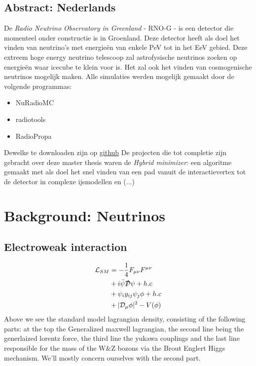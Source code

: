 \documentclass[11pt,a4paper,faculty=we,language=en,doctype=report]{cls/ugent-doc}
\begin{document}
\section{Abstract: Nederlands}
De \textit{Radio Neutrino Observatory in Greenland} - RNO-G - is een detector die momenteel onder constructie is
in Groenland. Deze detector heeft als doel het vinden van neutrino's met energieën van enkele PeV
tot in het EeV gebied. Deze extreem hoge energy neutrino telescoop zal astrofysische neutrinos
zoeken op energieën waar icecube te klein voor is. Het zal ook het vinden van cosmogenische
neutrinos mogelijk maken.
Alle simulaties werden mogelijk gemaakt door de volgende programmas:
\begin{itemize}
	\item NuRadioMC
	\item radiotools
	\item RadioPropa
\end{itemize}
Dewelke te downloaden zijn op \href{https://github.com/nu-radio}{github}
De projecten die tot completie zijn gebracht over deze master thesis waren de
\textit{Hybrid minimizer}: een algoritme gemaakt met als doel het snel vinden van
een pad vanuit de interactievertex tot de detector in complexe ijsmodellen en
(...)
\chapter{Background: Neutrinos}
\section{Electroweak interaction}
\begin{align*}
  \mathcal{L}_{SM} &= -\frac{1}{4}F_{\mu\nu}F^{\mu\nu}\\
                   & + i\bar{\psi}\slashed{\mathcal{D}}\psi + h.c\\
                   & + \psi_iy_{ij}\psi_j\phi + h.c\\
                   &+|\mathcal{D}_\mu\phi|^2 - V(\phi)
\end{align*}
Above we see the standard model lagrangian density, consisting of the following parts: at the top the Generalized maxwell lagrangian,
the second line being the generlaized lorentz force, the third line the yukawa couplings and the last line responsible for
the mass of the W\&Z bozons via the Brout Englert Higgs mechanism. We'll mostly concern ourselves with 
the second part.
\end{document}
